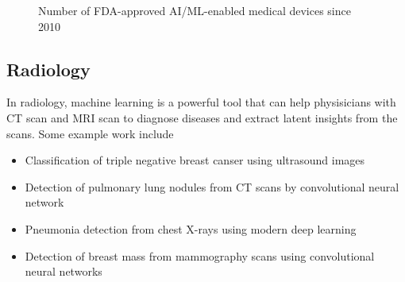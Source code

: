 \documentclass[a4paper]{article}
\begin{document}
\begin{figure}[htbp]
    \caption{Number of FDA-approved AI/ML-enabled medical devices since 2010} 
    \label{fig:FDA}
\end{figure}

\subsection{Radiology}
In radiology, machine learning is a powerful tool that can help physisicians with CT scan and MRI scan to diagnose diseases and extract latent insights from the scans. Some example work include
\begin{itemize}
    \item Classification of triple negative breast canser using ultrasound images \cite{wu_machine_2019}
    \item Detection of pulmonary lung nodules from CT scans by convolutional neural network \cite{van_ginneken_off--shelf_2015}
    \item Pneumonia detection from chest X-rays using modern deep learning \cite{rajpurkar_chexnet_2017}
    \item Detection of breast mass from mammography scans using convolutional neural networks \cite{arevalo_convolutional_2015}
\end{itemize} 
\end{document}

